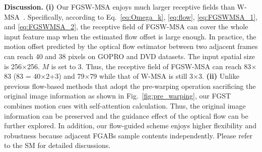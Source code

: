 \documentclass{article}
\begin{document}
	\noindent\textbf{Discussion.} \textbf{(i)} Our FGSW-MSA enjoys much larger receptive fields than W-MSA~\cite{liu2021swin}. Specifically, according to Eq.~\eqref{eq:Omega_k}, \eqref{eq:flow}, \eqref{eq:FGSWMSA_1}, and \eqref{eq:FGSWMSA_2}, the receptive field of FGSW-MSA can cover the whole input feature map when the estimated flow offset is large enough. In practice, the motion offset predicted by the optical flow estimator between two adjacent frames can reach 40 and 38 pixels on GOPRO and DVD datasets. The input spatial size is 256$\times$256. $M$ is set to 3. Thus, the receptive field of FGSW-MSA can reach 83$\times$83 (83 = 40$\times$2+3) and 79$\times$79 while that of W-MSA is still 3$\times$3. \textbf{(ii)} Unlike previous flow-based methods that adopt the pre-warping operation sacrificing the original image information as shown in Fig.~\ref{fig:pre_warping}, our FGST combines motion cues with self-attention calculation. Thus, the original image information can be preserved and the guidance effect of the optical flow can be further explored. In addition, our flow-guided scheme enjoys higher flexibility and robustness because adjacent FGABs sample contents independently. Please refer to the SM for detailed discussions. 
	
	
\end{document}
